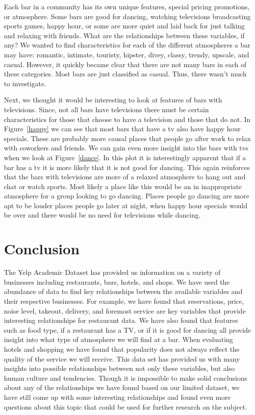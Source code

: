 \documentclass[11pt]{article}
\begin{document}
\vspace{5mm}
Each bar in a community has its own unique features, special pricing promotions, or atmosphere.  Some bars are good for dancing, watching televisions broadcasting sports games, happy hour, or some are more quiet and laid back for just talking and relaxing with friends.  What are the relationships between these variables, if any?  We wanted to find characteristics for each of the  different atmospheres a bar may have: romantic, intimate, touristy, hipster, divey, classy, trendy, upscale, and casual.  However, it quickly became clear that there are not many bars in each of these categories.  Most bars are just classified as casual.  Thus, there wasn't much to investigate.



Next, we thought it would be interesting to look at features of bars with televisions.  Since, not all bars have televisions there must be certain characteristics for those that choose to have a television and those that do not.   In  Figure~\ref{happy} we can see that most bars that have a tv also have happy hour specials.  These are probably more causal places that people go after work to relax with coworkers and friends.  We can gain even more insight into the bars with tvs when we look at  Figure~\ref{dance}.  In this plot it is interestingly apparent that if a bar has a tv it is more likely that it is not good for dancing.  This again reinforces that the bars with televisions are more of a relaxed atmosphere to hang out and chat or watch sports.  Most likely a place like this would be an in inappropriate atmosphere for a group looking to go dancing.  Places people go dancing are more apt to be louder places people go later at night, when happy hour specials would be over and there would be no need for televisions while dancing.  



\section{Conclusion}

The Yelp Academic Dataset has provided us information on a variety of businesses including restaurants, bars, hotels, and shops.  We have used the abundance of data to find key relationships between the available variables and their respective businesses.  For example, we have found that reservations, price, noise level, takeout, delivery, and foremost service are key variables that provide interesting relationships for restaurant data.  We have also found that features such as food type, if a restaurant has a TV, or if it is good for dancing all provide insight into what type of atmosphere we will find at a bar.  When evaluating hotels and shopping we have found that popularity does not always reflect the quality of the service we will receive.  This data set has provided us with many insights into possible relationships between not only these variables, but also human culture and tendencies.  Though it is impossible to make solid conclusions about any of the relationships we have found based on our limited dataset, we have still come up with some interesting relationships and found even more questions about this topic that could be used for further research on the subject.
\end{document}
